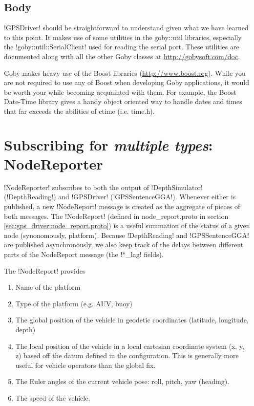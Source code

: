 \subsection{Body}
!GPSDriver! should be straightforward to understand given what we have learned to this point. It makes use of some utilities in the goby::util libraries, especially the !goby::util::SerialClient! used for reading the serial port. These utilities are documented along with all the other Goby classes at \url{http://gobysoft.com/doc}.

Goby makes heavy use of the Boost libraries (\url{http://www.boost.org}). While you are not required to use any of Boost when developing Goby applications, it would be worth your while becoming acquainted with them. For example, the Boost Date-Time library gives a handy object oriented way to handle dates and times that far exceeds the abilities of ctime (i.e. time.h).

\section{Subscribing for \textit{multiple types}: NodeReporter}

!NodeReporter! subscribes to both the output of !DepthSimulator! (!DepthReading!) and !GPSDriver! (!GPSSentenceGGA!). Whenever either is published, a new !NodeReport! message is created as the aggregate of pieces of both messages. The !NodeReport! (defined in node\_report.proto in section \ref{sec:gps_driver:node_report.proto}) is a useful summation of the status of a given node (synonomously, platform). Because !DepthReading! and !GPSSentenceGGA! are published asynchronously, we also keep track of the delays between different parts of the NodeReport message (the !*_lag! fields). 

The !NodeReport! provides
\begin{enumerate}
\item Name of the platform
\item Type of the platform (e.g. AUV, buoy)
\item The global position of the vehicle in geodetic coordinates (latitude, longitude, depth)
\item The local position of the vehicle in a local cartesian coordinate system (x, y, z) based off the datum defined in the configuration. This is generally more useful for vehicle operators than the global fix.
\item The Euler angles of the current vehicle pose: roll, pitch, yaw (heading). 
\item The speed of the vehicle.
\end{enumerate}

